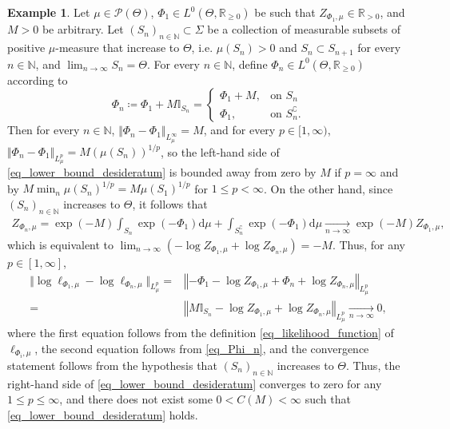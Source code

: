\documentclass[a4paper]{scrartcl}
\theoremstyle{definition}
\newtheorem{example}[theorem]{Example}
\numberwithin{equation}{section}
\newcommand{\R}{\mathbb{R}}
\newcommand{\N}{\mathbb{N}}
\newcommand{\rd}{\mathrm{d}}
\newcommand{\norm}[1]{\Vert #1 \Vert}
\newcommand{\Norm}[1]{\left\Vert #1 \right\Vert}
\begin{document}
\begin{example}
\label{example_misfit_to_log_likelihood_map_not_locally_invertible}
Let $\mu\in\mathcal{P}(\Theta)$, $\Phi_1\in L^0(\Theta,\R_{\geq 0})$ be such that $Z_{\Phi_1,\mu}\in \R_{>0}$, and $M>0$ be arbitrary. 
Let $(S_n)_{n\in\N}\subset\Sigma$ be a collection of measurable subsets of positive $\mu$-measure that increase to $\Theta$, i.e. $\mu(S_n)>0$ and $S_n\subset S_{n+1}$ for every $n\in\N$, and $\lim_{n\to\infty}S_n=\Theta$.
For every $n\in\N$, define $\Phi_{n}\in L^0(\Theta,\R_{\geq 0})$ according to
 \begin{equation}
 \label{eq_Phi_n}
  \Phi_{n}\coloneqq \Phi_1+M\mathbb{I}_{S_n}=\begin{cases} 
              \Phi_1+M, & \text{on $S_n$}
              \\
              \Phi_1, & \text{on $S_n^\complement$.}
             \end{cases}
 \end{equation}
Then for every $n\in\N$, $\norm{\Phi_n-\Phi_1}_{L^\infty_\mu}=M$, and for every $p\in [1,\infty)$, $\norm{\Phi_n-\Phi_1}_{L^p_\mu}=M(\mu(S_n))^{1/p}$, so the left-hand side of \eqref{eq_lower_bound_desideratum} is bounded away from zero by $M$ if $p=\infty$ and by $M\min_n \mu(S_n)^{1/p}=M\mu(S_1)^{1/p}$ for $1\leq p<\infty$.
On the other hand, since $(S_n)_{n\in\N}$ increases to $\Theta$, it follows that
\begin{align*}
 Z_{\Phi_{n},\mu}=\exp(-M)\int_{S_n} \exp(-\Phi_1)\rd \mu+ \int_{S_n^\complement} \exp(-\Phi_1)\rd \mu\xrightarrow[n\to\infty]{} \exp(-M)Z_{\Phi_1,\mu},
\end{align*}
which is equivalent to $\lim_{n\to\infty}(-\log Z_{\Phi_1,\mu}+\log Z_{\Phi_{n},\mu})=-M$.
Thus, for any $p\in [1,\infty]$,
\begin{align*}
 \norm{\log \ell_{\Phi_1,\mu}-\log\ell_{\Phi_{n},\mu} }_{L^p_\mu}=&\Norm{-\Phi_1-\log Z_{\Phi_1,\mu}+\Phi_{n}+\log Z_{\Phi_{n},\mu}}_{L^p_\mu}
 \\
 =& \Norm{ M\mathbb{I}_{S_n} -\log Z_{\Phi_1,\mu}+\log Z_{\Phi_{n},\mu}}_{L^p_\mu}\xrightarrow[n\to\infty]{}  0,
\end{align*}
where the first equation follows from the definition \eqref{eq_likelihood_function} of $\ell_{\Phi_i,\mu}$, the second equation follows from \eqref{eq_Phi_n}, and the convergence statement follows from the hypothesis that $(S_n)_{n\in\N}$ increases to $\Theta$.
Thus, the right-hand side of \eqref{eq_lower_bound_desideratum} converges to zero for any $1\leq p\leq \infty$, and there does not exist some $0<C(M)<\infty$ such that \eqref{eq_lower_bound_desideratum} holds.
\end{example}
\end{document}
